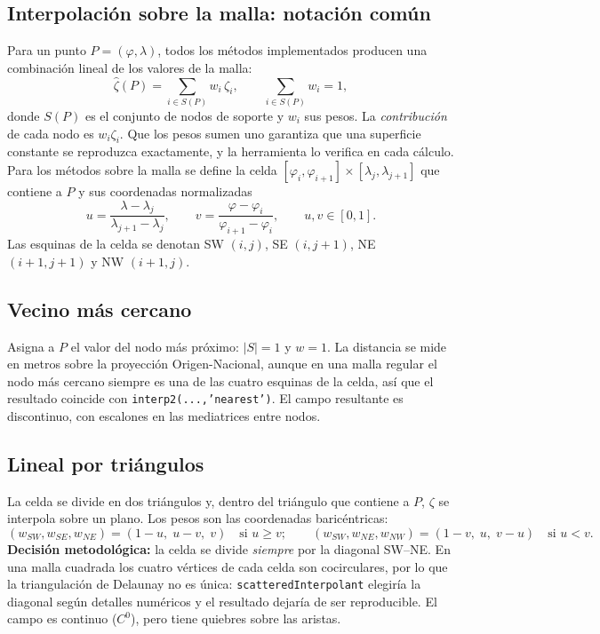 \documentclass[11pt,letterpaper]{article}
\begin{document}
\subsection{Interpolación sobre la malla: notación común}
Para un punto $P=(\varphi,\lambda)$, todos los métodos implementados producen una
combinación lineal de los valores de la malla:
\begin{equation}
\hat\zeta(P)=\sum_{i\in S(P)} w_i\,\zeta_i,
\qquad \sum_{i\in S(P)} w_i = 1,
\label{eq:combinacion}
\end{equation}
donde $S(P)$ es el conjunto de nodos de soporte y $w_i$ sus pesos. La
\emph{contribución} de cada nodo es $w_i\zeta_i$. Que los pesos sumen uno garantiza que
una superficie constante se reproduzca exactamente, y la herramienta lo verifica en cada
cálculo. Para los métodos sobre la malla se define la celda
$[\varphi_i,\varphi_{i+1}]\times[\lambda_j,\lambda_{j+1}]$ que contiene a $P$ y sus
coordenadas normalizadas
\begin{equation}
u=\frac{\lambda-\lambda_j}{\lambda_{j+1}-\lambda_j},\qquad
v=\frac{\varphi-\varphi_i}{\varphi_{i+1}-\varphi_i},\qquad u,v\in[0,1].
\label{eq:uv}
\end{equation}
Las esquinas de la celda se denotan SW $(i,j)$, SE $(i,j+1)$, NE $(i+1,j+1)$ y NW
$(i+1,j)$.

\subsection{Vecino más cercano}
Asigna a $P$ el valor del nodo más próximo: $|S|=1$ y $w=1$. La distancia se mide en
metros sobre la proyección Origen-Nacional, aunque en una malla regular el nodo más cercano
siempre es una de las cuatro esquinas de la celda, así que el resultado coincide con
\texttt{interp2(...,'nearest')}. El campo resultante es discontinuo, con escalones en
las mediatrices entre nodos.

\subsection{Lineal por triángulos}
La celda se divide en dos triángulos y, dentro del triángulo que contiene a $P$, $\zeta$
se interpola sobre un plano. Los pesos son las coordenadas baricéntricas:
\begin{equation}
(w_{SW},w_{SE},w_{NE}) = (1-u,\;u-v,\;v)\quad\text{si } u\ge v;\qquad
(w_{SW},w_{NE},w_{NW}) = (1-v,\;u,\;v-u)\quad\text{si } u<v.
\label{eq:triangulos}
\end{equation}
\textbf{Decisión metodológica:} la celda se divide \emph{siempre} por la diagonal SW--NE.
En una malla cuadrada los cuatro vértices de cada celda son cocirculares, por lo que la
triangulación de Delaunay no es única: \texttt{scatteredInterpolant} elegiría la diagonal
según detalles numéricos y el resultado dejaría de ser reproducible. El campo es continuo
($C^0$), pero tiene quiebres sobre las aristas.
\end{document}
